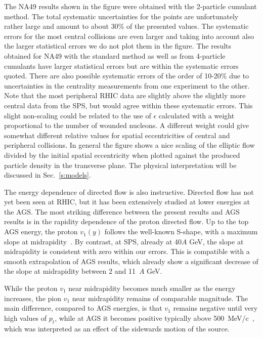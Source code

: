 \documentclass[aps,prc,superscriptaddress,showpacs,floatfix,nofootinbib]{revtex4}
\begin{document}
The NA49 results shown in the figure were obtained with the 2-particle
cumulant method. The total systematic uncertainties for the points are
unfortunately rather large and amount to about 30\% of the presented
values.  The systematic errors for the most central collisions are
even larger and taking into account also the larger statistical errors
we do not plot them in the figure. The results obtained for NA49 with
the standard method as well as from 4-particle cumulants have larger
statistical errors but are within the systematic errors quoted.  There
are also possible systematic errors of the order of 10-20\% due to
uncertainties in the centrality measurements from one experiment to
the other. Note that the most peripheral RHIC data are slightly above
the slightly more central data from the SPS, but would agree within
these systematic errors. This slight non-scaling could be related to
the use of $\epsilon$ calculated with a weight proportional to the
number of wounded nucleons.  A different weight could give somewhat
different relative values for spatial eccentricities of central and
peripheral collisions.  In general the figure shows a nice scaling of
the elliptic flow divided by the initial spatial eccentricity when
plotted against the produced particle density in the transverse
plane. The physical interpretation will be discussed in
Sec.~\ref{s:models}.

The energy dependence of directed flow is also instructive.  Directed
flow has not yet been seen at RHIC, but it has been extensively
studied at lower energies at the AGS.  The most striking difference
between the present results and AGS results is in the rapidity
dependence of the proton directed flow. Up to the top AGS energy, the
proton $v_1(y)$ follows the well-known S-shape, with a maximum slope
at midrapidity~\cite{Liu:2000am}. By contrast, at SPS, already at
40$A$ GeV, the slope at midrapidity is consistent with zero within our
errors. This is compatible with a smooth extrapolation of AGS results,
which already show a significant decrease of the slope at midrapidity
between 2 and 11~$A$ GeV.

While the proton $v_1$ near midrapidity becomes much smaller as the
energy increases, the pion $v_1$ near midrapidity remains of
comparable magnitude.  The main difference, compared to AGS energies,
is that $v_1$ remains negative until very high values of $p_t$, while
at AGS it becomes positive typically above
500~MeV/c~\cite{Barrette:1997pt}, which was interpreted as an effect
of the sidewards motion of the source.
\end{document}

